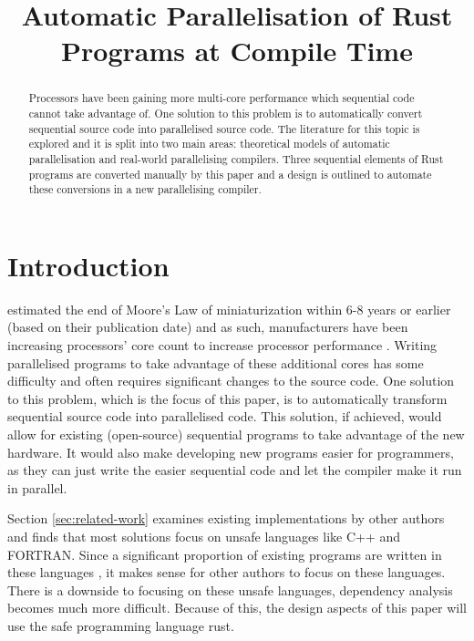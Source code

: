 \documentclass[conference]{IEEEtran}
\begin{document}
\title{Automatic Parallelisation of Rust Programs at Compile Time}

\author{
\and
{}
}

\maketitle

\begin{abstract}
  Processors have been gaining more multi-core performance which sequential code cannot take advantage of. One solution to this problem is to automatically convert sequential source code into parallelised source code. The literature for this topic is explored and it is split into two main areas: theoretical models of automatic parallelisation and real-world parallelising compilers. Three sequential elements of Rust programs are converted manually by this paper and a design is outlined to automate these conversions in a new parallelising compiler.
\end{abstract}

\section{Introduction}
\textcite{Kish2002} estimated the end of Moore's Law of miniaturization within 6-8 years or earlier (based on their publication date) and as such, manufacturers have been increasing processors' core count to increase processor performance \parencite{Geer2005}. Writing parallelised programs to take advantage of these additional cores has some difficulty and often requires significant changes to the source code. One solution to this problem, which is the focus of this paper, is to automatically transform sequential source code into parallelised code. This solution, if achieved, would allow for existing (open-source) sequential programs to take advantage of the new hardware. It would also make developing new programs easier for programmers, as they can just write the easier sequential code and let the compiler make it run in parallel.

Section \ref{sec:related-work} examines existing implementations by other authors and finds that most solutions focus on unsafe languages like C++ and FORTRAN. Since a significant proportion of existing programs are written in these languages , it makes sense for other authors to focus on these languages. There is a downside to focusing on these unsafe languages, dependency analysis becomes much more difficult. Because of this, the design aspects of this paper will use the safe programming language rust.
\end{document}
